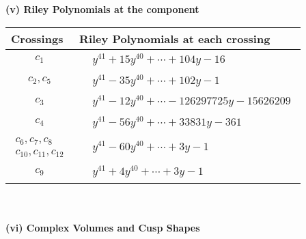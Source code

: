 \documentclass[1p]{elsarticle_modified}
\theoremstyle{definition}
\begin{document}
\newpage\renewcommand{\arraystretch}{1}
\flushleft \textbf{(v) Riley Polynomials at the component}\newline \\
\begin{tabular}{m{50pt}|m{274pt}}
Crossings & \hspace{64pt}Riley Polynomials at each crossing \\
\hline $$\begin{aligned}c_{1}\end{aligned}$$&$\begin{aligned}
&y^{41}+15 y^{40}+\cdots+104 y-16
\end{aligned}$\\
\hline $$\begin{aligned}c_{2},c_{5}\end{aligned}$$&$\begin{aligned}
&y^{41}-35 y^{40}+\cdots+102 y-1
\end{aligned}$\\
\hline $$\begin{aligned}c_{3}\end{aligned}$$&$\begin{aligned}
&y^{41}-12 y^{40}+\cdots-126297725 y-15626209
\end{aligned}$\\
\hline $$\begin{aligned}c_{4}\end{aligned}$$&$\begin{aligned}
&y^{41}-56 y^{40}+\cdots+33831 y-361
\end{aligned}$\\
\hline $$\begin{aligned}c_{6},c_{7},c_{8}\\c_{10},c_{11},c_{12}\end{aligned}$$&$\begin{aligned}
&y^{41}-60 y^{40}+\cdots+3 y-1
\end{aligned}$\\
\hline $$\begin{aligned}c_{9}\end{aligned}$$&$\begin{aligned}
&y^{41}+4 y^{40}+\cdots+3 y-1
\end{aligned}$\\
\hline
\end{tabular}\\~\\
\newpage\flushleft \textbf{(vi) Complex Volumes and Cusp Shapes}
\end{document}
